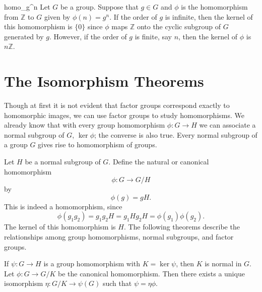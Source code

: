  
\begin{example}{homo_g^n}
Let $G$ be a group. Suppose that  $g \in G$ and $\phi$ is the
homomorphism from ${\mathbb Z}$ to $G$ given by $\phi( n ) = g^n$. If the
order of $g$ is infinite, then the kernel of this homomorphism is $\{
0 \}$ since $\phi$ maps ${\mathbb Z}$ onto the cyclic subgroup of $G$
generated by $g$. However, if the order of $g$ is finite, say $n$,
then the kernel of $\phi$ is $n {\mathbb Z}$.
\end{example}
 

 
 
 
\section{The Isomorphism Theorems}
 
 
Though at first it is not evident that factor groups correspond
exactly to homomorphic images, we can use factor groups to study
homomorphisms. We already know that with every group homomorphism
$\phi: G \rightarrow H$ we can associate a normal subgroup of $G$,
$\ker \phi$; the converse is also true. Every normal subgroup of a
group $G$ gives rise to homomorphism of groups. 
 
Let $H$ be a normal subgroup of $G$. Define the {\bfi
natural\/} or {\bfi canonical
homomorphism}  
\[
\phi : G \rightarrow G/H
\]
by
\[
\phi(g) = gH.
\]
This is indeed a homomorphism, since
\[
\phi( g_1 g_2 ) = g_1 g_2 H =  g_1 H g_2 H = \phi( g_1) \phi( g_2 ). 
\]
The kernel of this homomorphism is $H$.	 The following theorems 
describe the relationships among group homomorphisms, normal 
subgroups, and factor groups. 
 
 
\begin{theorem}\label{FirstIsoTheorem}
If $\psi : G \rightarrow H$ is a group homomorphism with $K =\ker
\psi$, then $K$ is normal in $G$. Let $\phi: G \rightarrow G/K$ be
the canonical homomorphism.  Then there exists a unique isomorphism
$\eta: G/K \rightarrow \psi(G)$ such that $\psi =  \eta \phi$.
\end{theorem}
 

